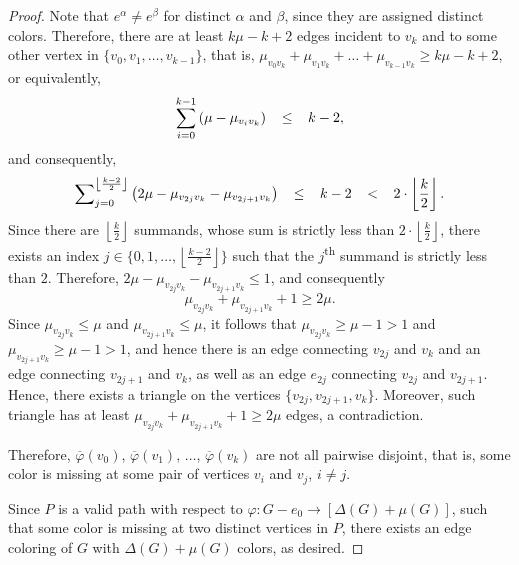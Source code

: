 \begin{proof}
    Note that \(e^{\alpha} \neq e^{\beta}\) for distinct \(\alpha\) and \(\beta\), since they are assigned distinct colors.
    Therefore, there are at least \(k\mu - k + 2\) edges incident to \(v_k\) and to some other vertex in \(\{v_0, v_1, \dots, v_{k-1}\}\),
    that is,
    \( \mu_{v_0v_k} + \mu_{v_1v_k} + \dots + \mu_{v_{k-1}v_k} \geq k\mu - k + 2\),
    or equivalently,
    \begin{equation}
        \thickmuskip=20mu
        \sum_{i=0}^{k-1}
        \left( \mu - \mu_{v_iv_k} \right) \leq k - 2,
    \end{equation}
    and consequently,
    \begin{equation}
        \thickmuskip=20mu
        \sum\nolimits_{j=0}^{\left\lfloor\frac{k-2}{2}\right\rfloor}
        \left( 2\mu - \mu_{v_{2j}v_k} - \mu_{v_{2j+1}v_k} \right) \leq k - 2 < 2 \cdot \left\lfloor\frac{k}{2}\right\rfloor.
    \end{equation}
    Since there are \(\left\lfloor\frac{k}{2}\right\rfloor\) summands, whose sum is strictly less than \(2 \cdot \left\lfloor\frac{k}{2}\right\rfloor\),
    there exists an index \(j \in \{0, 1, \dots, \left\lfloor\frac{k-2}{2}\right\rfloor\}\) such that the \(j\)\textsuperscript{th} summand is strictly less than \(2\).
    Therefore,
    \( 2\mu - \mu_{v_{2j}v_k} - \mu_{v_{2j+1}v_k} \leq 1 \),
    and consequently
    \begin{equation}
        \mu_{v_{2j}v_k} + \mu_{v_{2j+1}v_k} + 1 \geq 2\mu.
    \end{equation}
    Since \(\mu_{v_{2j}v_k} \leq \mu\) and \(\mu_{v_{2j+1}v_k} \leq \mu\),
    it follows that \(\mu_{v_{2j}v_k} \geq \mu - 1 > 1\) and \(\mu_{v_{2j+1}v_k} \geq \mu - 1 > 1\),
    and hence there is an edge connecting \(v_{2j}\) and \(v_k\) and an edge connecting \(v_{2j+1}\) and \(v_k\),
    as well as an edge \(e_{2j}\) connecting \(v_{2j}\) and \(v_{2j+1}\).
    Hence, there exists a triangle on the vertices \(\{v_{2j}, v_{2j+1}, v_k\}\).
    Moreover, such triangle has at least
    \( \mu_{v_{2j}v_k} + \mu_{v_{2j+1}v_k} + 1 \geq 2\mu \) edges,
    a contradiction.

    Therefore,
    \(\overline\varphi(v_0)\),
    \(\overline\varphi(v_1)\),
    \(\dots\),
    \(\overline\varphi(v_k)\)
    are not all pairwise disjoint, that is,
    some color is missing at some pair of vertices \(v_i\) and \(v_j\), \(i \neq j\).

    Since \(P\) is a valid path with respect to \(\varphi \colon G-e_0 \to [\Delta(G) + \mu(G)]\),
    such that some color is missing at two distinct vertices in \(P\),
    there exists an edge coloring of \(G\) with \(\Delta(G) + \mu(G)\) colors,
    as desired.
\end{proof}

